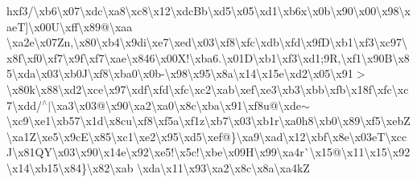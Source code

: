 \begin{DoxyCompactItemize}
h{}xf3/\textbackslash{}xb6\textbackslash{}x07\textbackslash{}xdc\textbackslash{}xa8\textbackslash{}xc8\textbackslash{}x12\textbackslash{}xdc\+Bb\textbackslash{}xd5\textbackslash{}x05\textbackslash{}xd1\textbackslash{}xb6x\textbackslash{}x0b\textbackslash{}x90\textbackslash{}x00\textbackslash{}x98\textbackslash{}xae\+T\mbox{]}\textbackslash{}x00\+U\textbackslash{}xff\textbackslash{}x89@\textbackslash{}xaa \textbackslash{}xa2e\textbackslash{}x07\+Zn,\textbackslash{}x80\textbackslash{}xb4\textbackslash{}x9di\textbackslash{}xe7\textbackslash{}xed\textbackslash{}x03\textbackslash{}xf8\textbackslash{}xfc\textbackslash{}xdb\textbackslash{}xfd\textbackslash{}x9f\+D\textbackslash{}xb1\textbackslash{}xf3\textbackslash{}xc97\textbackslash{}x8f\textbackslash{}xf0\textbackslash{}xf7\textbackslash{}x9f\textbackslash{}xf7\textbackslash{}xae\textbackslash{}x846\textbackslash{}x00\+X!\textbackslash{}xba6.\textbackslash{}x01\+D\textbackslash{}xb1\textbackslash{}xf3\textbackslash{}xd1;9\+R,\textbackslash{}xf1\textbackslash{}x90\+B\textbackslash{}x85\textbackslash{}xda\textbackslash{}x03\textbackslash{}xb0\+J\textbackslash{}xf8\textbackslash{}xba0\textbackslash{}x0b-\/\textbackslash{}x98\textbackslash{}x95\textbackslash{}x8a\textbackslash{}x14\textbackslash{}x15e\textbackslash{}xd2\textbackslash{}x05\textbackslash{}x91$>$\textbackslash{}x80k\textbackslash{}x88\textbackslash{}xd2\textbackslash{}xce\textbackslash{}x97\textbackslash{}xdf\textbackslash{}xfd\textbackslash{}xfc\textbackslash{}xc2\textbackslash{}xab\textbackslash{}xef\textbackslash{}xe3\textbackslash{}xb3\textbackslash{}xbb\textbackslash{}xfb\textbackslash{}x18f\textbackslash{}xfc\textbackslash{}xc7\textbackslash{}xdd/$^\wedge$$\vert$\textbackslash{}xa3\textbackslash{}x03@\textbackslash{}x90\textbackslash{}xa2\textbackslash{}xa0\textbackslash{}x8c\textbackslash{}xba\textbackslash{}x91\textbackslash{}xf8u@\textbackslash{}xde$\sim$\textbackslash{}xc9\textbackslash{}xe1\textbackslash{}xb57\textbackslash{}x1d\textbackslash{}x8cu\textbackslash{}xf8\textbackslash{}xf5a\textbackslash{}xf1z\textbackslash{}xb7\textbackslash{}x03\textbackslash{}xb1r\textbackslash{}xa0h8\textbackslash{}xb0\textbackslash{}x89\textbackslash{}xf5\textbackslash{}xeb\+Z\textbackslash{}xa1\+Z\textbackslash{}xe5\textbackslash{}x9c\+E\textbackslash{}x85\textbackslash{}xc1\textbackslash{}xe2\textbackslash{}x95\textbackslash{}xd5\textbackslash{}xef@\}\textbackslash{}xa9\textbackslash{}xad\textbackslash{}x12\textbackslash{}xbf\textbackslash{}x8e\textbackslash{}x03e\+T\textbackslash{}xcc\+J\textbackslash{}x81\+Q\+Y\textbackslash{}x03\textbackslash{}x90\textbackslash{}x14e\textbackslash{}x92\textbackslash{}xe5!\textbackslash{}x5c!\textbackslash{}xbe\textbackslash{}x09\+H\textbackslash{}x99\textbackslash{}xa4r\`{}\textbackslash{}x15@\textbackslash{}x11\textbackslash{}x15\textbackslash{}x92\textbackslash{}x14\textbackslash{}xb15\textbackslash{}x84\}\textbackslash{}x82\textbackslash{}xab \textbackslash{}xda\textbackslash{}x11\textbackslash{}x93\textbackslash{}xa2\textbackslash{}x8c\textbackslash{}x8a\textbackslash{}xa4k\+Z 
\end{DoxyCompactItemize}
